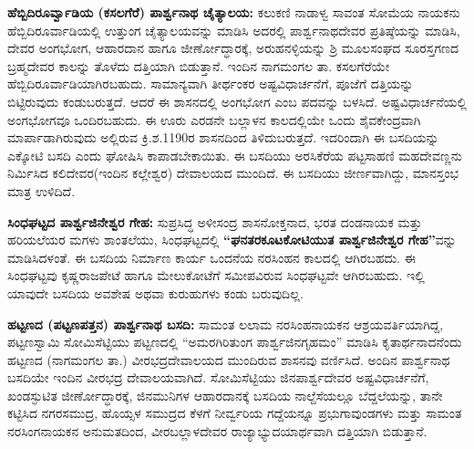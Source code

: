 \textbf{ಹೆಬ್ಬಿದಿರೂರ್ವ್ವಾಡಿಯ (ಕಸಲಗೆರೆ) ಪಾರ್ಶ್ವನಾಥ ಚೈತ್ಯಾಲಯ:} ಕಲುಕಣಿ ನಾಡಾಳ್ವ ಸಾವಂತ ಸೋಮೆಯ ನಾಯಕನು ಹೆಬ್ಬಿದಿರೂರ್ವಾಡಿಯಲ್ಲಿ ಉತ್ತುಂಗ ಚೈತ್ಯಾಲಯವನ್ನು ಮಾಡಿಸಿ ಅದರಲ್ಲಿ ಪಾರ್ಶ್ವನಾಥದೇವರ ಪ್ರತಿಷ್ಠೆಯನ್ನು ಮಾಡಿಸಿ, ದೇವರ ಅಂಗಭೋಗ, ಆಹಾರದಾನ ಹಾಗೂ ಜೀರ್ಣೋದ್ಧಾರಕ್ಕೆ, ಅರುಹನಳ್ಳಿಯನ್ನು ಶ್ರಿ ಮೂಲಸಂಘದ ಸೂರಸ್ತಗಣದ ಬ್ರಹ್ಮದೇವರ ಕಾಲನ್ನು ತೊಳೆದು ದತ್ತಿಯಾಗಿ ಬಿಡುತ್ತಾನೆ. ಇಂದಿನ ನಾಗಮಂಗಲ ತಾ. ಕಸಲಗೆರೆಯೇ ಹೆಬ್ಬಿದಿರೂರ್ವಾಡಿಯಾಗಿರ\-ಬಹುದು. ಸಾಮಾನ್ಯವಾಗಿ ತೀರ್ಥಂಕರ ಅಷ್ಟವಿಧಾರ್ಚನೆಗೆ, ಪೂಜೆಗೆ ದತ್ತಿಯನ್ನು ಬಿಟ್ಟಿರುವುದು ಕಂಡುಬರುತ್ತದೆ. ಆದರೆ ಈ ಶಾಸನದಲ್ಲಿ ಅಂಗಭೋಗ ಎಂಬ ಪದವನ್ನು ಬಳಸಿದೆ. ಅಷ್ಟವಿಧಾರ್ಚನೆಯಲ್ಲಿ ಅಂಗಭೋಗವೂ ಒಂದಿರಬಹುದು. ಈ ಊರು ಎರಡನೇ ಬಲ್ಲಾಳನ ಕಾಲದಲ್ಲಿಯೇ ಒಂದು ಶೈವಕೇಂದ್ರವಾಗಿ ಮಾರ್ಪಾಡಾಗಿರುವುದು ಅಲ್ಲಿರುವ ಕ್ರಿ.ಶ.1190ರ ಶಾಸನದಿಂದ ತಿಳಿದುಬರುತ್ತದೆ. ಇದರಿಂದಾಗಿ ಈ ಬಸದಿಯನ್ನು ಎಕ್ಕೋಟಿ ಬಸದಿ ಎಂದು ಘೋಷಿಸಿ ಕಾಪಾಡಬೇಕಾಯಿತು. ಈ ಬಸದಿಯು ಅರಸಿಕೆರೆಯ ಪಟ್ಟಸಾಹಣಿ ಮಹದೇವಣ್ಣನು ನಿರ್ಮಿಸಿದ ಕಲಿದೇವರ(ಇಂದಿನ ಕಲ್ಲೇಶ್ವರ) ದೇವಾಲಯದ ಮುಂದಿದೆ. ಈ ಬಸದಿಯು ಜೀರ್ಣವಾಗಿದ್ದು, ಮಾನಸ್ತಂಭ ಮಾತ್ರ ಉಳಿದಿದೆ.

\textbf{ಸಿಂಧಘಟ್ಟದ ಪಾರ್ಶ್ವಜಿನೇಶ್ವರ ಗೇಹ:} ಸುಪ್ರಸಿದ್ಧ ಅಳೀಸಂದ್ರ ಶಾಸನೋಕ್ತನಾದ, ಭರತ ದಂಡನಾಯಕ ಮತ್ತು ಹರಿಯಲೆಯರ ಮಗಳು ಶಾಂತಲೆಯು, ಸಿಂಧಘಟ್ಟದಲ್ಲಿ \textbf{“ಘನತರಕೂಟಕೋಟಿಯುತ ಪಾರ್ಶ್ವಜಿನೇಶ್ವರ ಗೇಹ”}ವನ್ನು ಮಾಡಿಸಿದ\-ಳಂತೆ. ಈ ಬಸದಿಯ ನಿರ್ಮಾಣ ಕಾರ್ಯ ಒಂದನೆಯ ನರಸಿಂಹನ ಕಾಲದಲ್ಲಿ ಆಗಿರಬಹದು. ಈ ಸಿಂಧಘಟ್ಟವು ಕೃಷ್ಣರಾಜಪೇಟೆ ಹಾಗೂ ಮೇಲುಕೋಟೆಗೆ ಸಮೀಪವಿರುವ ಸಿಂಧಘಟ್ಟವೇ ಆಗಿರಬಹುದು. ಇಲ್ಲಿ ಯಾವುದೇ ಬಸದಿಯ ಅವಶೇಷ ಅಥವಾ ಕುರುಹುಗಳು ಕಂಡು ಬರುವುದಿಲ್ಲ.

\textbf{ಹಟ್ಟಣದ (ಪಟ್ಟಣ\general{\enginline{-}}ಪತ್ತನ) ಪಾರ್ಶ್ವನಾಥ ಬಸದಿ:} ಸಾಮಂತ ಲಲಾಮ ನರಸಿಂಹನಾಯಕನ ಆಶ್ರಯವರ್ತಿಯಾಗಿದ್ದ, ಪಟ್ಟಣಸ್ವಾಮಿ ಸೋಮಿಸೆಟ್ಟಿಯು ಪಟ್ಟಣದಲ್ಲಿ “ಅಮರಗಿರಿತುಂಗ ಪಾರ್ಶ್ವಜಿನಗೃಹಮಂ” ಮಾಡಿಸಿ ಕೃತಾರ್ಥನಾದನೆಂದು ಹಟ್ಟಣದ (ನಾಗಮಂಗಲ ತಾ.) ವೀರಭದ್ರದೇವಾಲಯದ ಮುಂದಿರುವ ಶಾಸನವು ವರ್ಣಿಸಿದೆ. ಅಂದಿನ ಪಾರ್ಶ್ವನಾಥ ಬಸದಿಯೇ ಇಂದಿನ ವೀರಭದ್ರ ದೇವಾಲಯವಾಗಿದೆ. ಸೋಮಿಸೆಟ್ಟಿಯು ಜಿನಪಾರ್ಶ್ವದೇವರ ಅಷ್ಟವಿಧಾರ್ಚನೆಗೆ, ಖಂಡಸ್ಫುಟಿತ ಜೀರ್ಣೋದ್ಧಾರಕ್ಕೆ, ಜಿನಮುನಿಗಳ ಆಹಾರದಾನಕ್ಕೆ ಬಸದಿಯ ನಾಲ್ದೆಸೆಯಲ್ಲೂ ಬೆದ್ದಲೆಯನ್ನು, ತಾನೇ ಕಟ್ಟಿಸಿದ ನಗರಸಮುದ್ರ, ಹೊಯ್ಸಳ ಸಮುದ್ರದ ಕೆಳಗೆ ನೀರ್ವ್ವರಿಯ ಗದ್ದೆಯನ್ನೂ ಪ್ರಭುಗಾವುಂಡಗಳು ಮತ್ತು ಸಾಮಂತ ನರಸಿಂಗನಾಯಕನ ಅನುಮತದಿಂದ, ವೀರಬಲ್ಲಾಳದೇವರ ರಾಜ್ಯಾಭ್ಯುದಯಾರ್ಥವಾಗಿ ದತ್ತಿಯಾಗಿ ಬಿಡುತ್ತಾನೆ.

